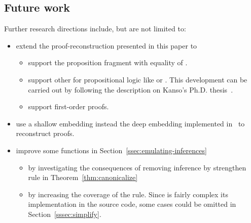 \documentclass[../main.tex]{subfiles}
\begin{document}
\subsection*{Future work}

Further research directions include, but are not limited to:

\begin{itemize}
\item extend the proof-reconstruction presented in this paper to
  \begin{itemize}
    \item support the proposition fragment with equality of \Metis.
    \item support other \ATPs for propositional logic like  or . This development can be carried out by following the 
description on Kanso's Ph.D. thesis~\cite{Kanso2012}.
    \item support \Metis first-order proofs.

  \end{itemize}
\item use a shallow embedding instead the deep embedding implemented in~\cite{AgdaProp} to reconstruct proofs.
\item improve some functions in Section~\ref{ssec:emulating-inferences}
\begin{itemize}
  \item by investigating the consequences of removing \clausify
inference by strengthen \canonicalize rule in Theorem~\ref{thm:canonicalize}
  \item by increasing the coverage of the \simplify rule. Since is fairly
complex its implementation in the \Metis source code, some cases could be omitted in Section~\ref{sssec:simplify}.
\end{itemize}


\end{itemize}
\end{document}
